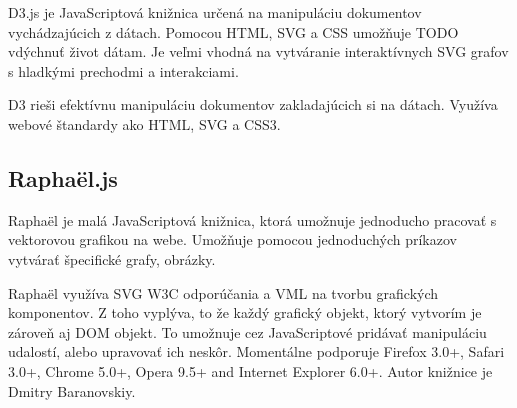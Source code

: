 D3.js je JavaScriptová knižnica určená na manipuláciu dokumentov vychádzajúcich z dátach. Pomocou \acs{HTML}, \acs{SVG} a \acs{CSS} umožňuje TODO vdýchnuť život dátam. 
Je veľmi vhodná na vytváranie interaktívnych SVG grafov s hladkými prechodmi a interakciami. 



D3 rieši efektívnu manipuláciu dokumentov zakladajúcich si na dátach. Využíva webové štandardy ako \acs{HTML}, \acs{SVG} a \acs{CSS}3. \cite{d3js}


\subsection{Raphaël.js}

Raphaël je malá JavaScriptová knižnica, ktorá umožnuje jednoducho pracovať s vektorovou grafikou na webe. Umožňuje pomocou jednoduchých príkazov vytvárať špecifické grafy, obrázky. 

Raphaël využíva \acs{SVG} \acs{W3C} odporúčania a \acs{VML} na tvorbu grafických komponentov. Z toho vyplýva, to že každý grafický objekt, ktorý vytvorím je zároveň aj DOM objekt. To umožnuje cez JavaScriptové pridávať manipuláciu udalostí, alebo upravovať ich neskôr.
Momentálne podporuje Firefox 3.0+, Safari 3.0+, Chrome 5.0+, Opera 9.5+ and Internet Explorer 6.0+.
Autor knižnice je Dmitry Baranovskiy. \cite{Raphael}


